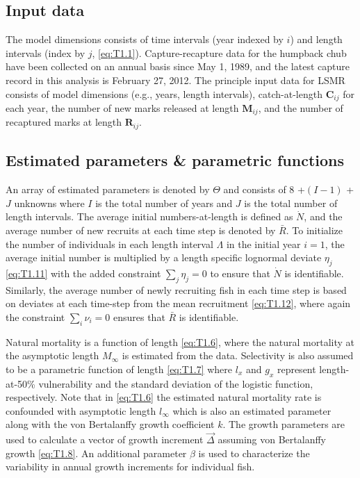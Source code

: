 \subsection{Input data} %
\label{sub:input_data}

The model dimensions consists of time intervals (year indexed by $i$) and length intervals (index by $j$, \ref{eq:T1.1}).  Capture-recapture data for the humpback chub have been collected on an annual basis since May 1, 1989,  and the latest capture record in this analysis is February 27, 2012.  The principle input data for LSMR consists of model dimensions (e.g., years, length intervals), catch-at-length $\mathbf{C}_{ij}$ for each year, the number of new marks released at length $\mathbf{M}_{ij}$, and the number of recaptured marks at length $\mathbf{R}_{ij}$.



\subsection{Estimated parameters \& parametric functions} %
\label{sub:estimated_parameters}
An array of estimated parameters is denoted by $\Theta$ and consists of 8 +$(I-1)$ +$J$ unknowns where $I$ is the total number of years and $J$ is the total number of length intervals.  The average initial numbers-at-length is defined as $\dot{N}$, and the average number of new recruits at each time step is denoted by $\bar{R}$.  To initialize the number of individuals in each length interval $\Lambda$ in the initial year $i=1$, the average initial number is multiplied by a length specific lognormal deviate $\eta_j$ \eqref{eq:T1.11} with the added constraint $\sum_j \eta_j = 0$ to ensure that $\dot{N}$ is identifiable. Similarly, the average number of newly recruiting fish in each time step is based on deviates at each time-step from the mean recruitment \eqref{eq:T1.12}, where again the constraint $\sum_i \nu_i = 0$ ensures that $\bar{R}$ is identifiable.

Natural mortality is a function of length \eqref{eq:T1.6}, where the natural mortality at the asymptotic length $M_\infty$ is estimated from the data. Selectivity is also assumed to be a parametric function of length \eqref{eq:T1.7} where $l_x$ and $g_x$ represent length-at-50\% vulnerability and the standard deviation of the logistic function, respectively.  Note that in \eqref{eq:T1.6} the estimated natural mortality rate is confounded with asymptotic length $l_\infty$ which is also an estimated parameter along with the von Bertalanffy growth coefficient $k$.  The growth parameters are used to calculate a vector of growth increment $\vec{\Delta}$ assuming von Bertalanffy growth \eqref{eq:T1.8}. An additional parameter $\beta$ is used to characterize the variability in annual growth increments for individual fish. 


